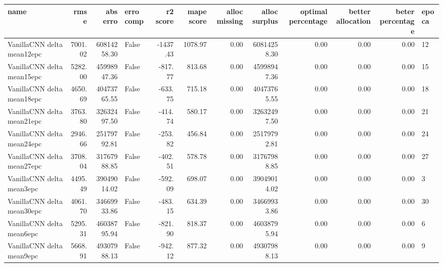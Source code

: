 \begin{tabular}{lrrlrrrrrrrl}
\toprule
name & rmse & abs erro & erro comp & r2 score & mape score & alloc missing & alloc surplus & optimal percentage & better allocation & beter percentage & epoca \\
\midrule
VanillaCNN delta mean12epc & 7001.02 & 60814258.30 & False & -1437.43 & 1078.97 & 0.00 & 60814258.30 & 0.00 & 0.00 & 0.00 & 12 \\
VanillaCNN delta mean15epc & 5282.00 & 45998947.36 & False & -817.77 & 813.68 & 0.00 & 45998947.36 & 0.00 & 0.00 & 0.00 & 15 \\
VanillaCNN delta mean18epc & 4650.69 & 40473765.55 & False & -633.75 & 715.18 & 0.00 & 40473765.55 & 0.00 & 0.00 & 0.00 & 18 \\
VanillaCNN delta mean21epc & 3763.80 & 32632497.50 & False & -414.74 & 580.17 & 0.00 & 32632497.50 & 0.00 & 0.00 & 0.00 & 21 \\
VanillaCNN delta mean24epc & 2946.66 & 25179792.81 & False & -253.82 & 456.84 & 0.00 & 25179792.81 & 0.00 & 0.00 & 0.00 & 24 \\
VanillaCNN delta mean27epc & 3708.04 & 31767988.85 & False & -402.51 & 578.78 & 0.00 & 31767988.85 & 0.00 & 0.00 & 0.00 & 27 \\
VanillaCNN delta mean3epc & 4495.49 & 39049014.02 & False & -592.09 & 698.07 & 0.00 & 39049014.02 & 0.00 & 0.00 & 0.00 & 3 \\
VanillaCNN delta mean30epc & 4061.70 & 34669933.86 & False & -483.15 & 634.39 & 0.00 & 34669933.86 & 0.00 & 0.00 & 0.00 & 30 \\
VanillaCNN delta mean6epc & 5295.31 & 46038795.94 & False & -821.90 & 818.37 & 0.00 & 46038795.94 & 0.00 & 0.00 & 0.00 & 6 \\
VanillaCNN delta mean9epc & 5668.91 & 49307988.13 & False & -942.12 & 877.32 & 0.00 & 49307988.13 & 0.00 & 0.00 & 0.00 & 9 \\
\bottomrule
\end{tabular}
